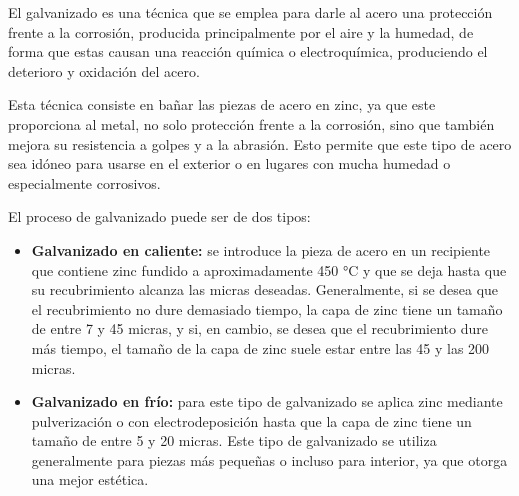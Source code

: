 
El galvanizado \cite{ferrosplanes} es una técnica que se emplea para darle al acero una protección frente a la corrosión, producida principalmente por el aire y la humedad, de forma que estas causan una reacción química o electroquímica, produciendo el deterioro y oxidación del acero. 

Esta técnica consiste en bañar las piezas de acero en zinc, ya que este proporciona al metal, no solo protección frente a la corrosión, sino que también mejora su resistencia a golpes y a la abrasión. Esto permite que este tipo de acero sea idóneo para usarse en el exterior o en lugares con mucha humedad o especialmente corrosivos.

El proceso de galvanizado puede ser de dos tipos:
\begin{itemize}
    \item \textbf{Galvanizado en caliente:} se introduce la pieza de acero en un recipiente que contiene zinc fundido a aproximadamente 450 °C y que se deja hasta que su recubrimiento alcanza las micras deseadas. Generalmente, si se desea que el recubrimiento no dure demasiado tiempo, la capa de zinc tiene un tamaño de entre 7 y 45 micras, y si, en cambio, se desea que el recubrimiento dure más tiempo, el tamaño de la capa de zinc suele estar entre las 45 y las 200 micras.
    \item \textbf{Galvanizado en frío:} para este tipo de galvanizado se aplica zinc mediante pulverización o con electrodeposición hasta que la capa de zinc tiene un tamaño de entre 5 y 20 micras. Este tipo de galvanizado se utiliza generalmente para piezas más pequeñas o incluso para interior, ya que otorga una mejor estética. 
\end{itemize}

